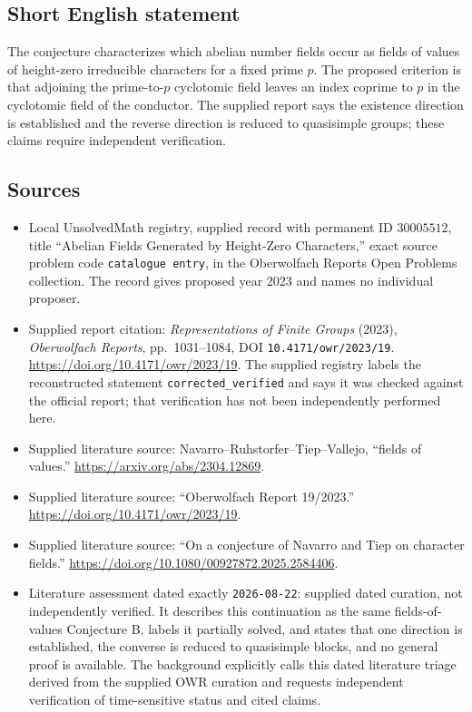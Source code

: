 \documentclass[11pt]{article}
\begin{document}
\subsection{Short English statement}
The conjecture characterizes which abelian number fields occur as fields of values of height-zero irreducible characters for a fixed prime \(p\). The proposed criterion is that adjoining the prime-to-\(p\) cyclotomic field leaves an index coprime to \(p\) in the cyclotomic field of the conductor. The supplied report says the existence direction is established and the reverse direction is reduced to quasisimple groups; these claims require independent verification.
\subsection{Sources}
\begin{itemize}
\item Local UnsolvedMath registry, supplied record with permanent ID \(30005512\), title ``Abelian Fields Generated by Height-Zero Characters,'' exact source problem code \texttt{catalogue entry}, in the Oberwolfach Reports Open Problems collection. The record gives proposed year 2023 and names no individual proposer.
\item Supplied report citation: \emph{Representations of Finite Groups} (2023), \emph{Oberwolfach Reports}, pp.~1031--1084, DOI \texttt{10.4171/owr/2023/19}. \url{https://doi.org/10.4171/owr/2023/19}. The supplied registry labels the reconstructed statement \texttt{corrected\_verified} and says it was checked against the official report; that verification has not been independently performed here.
\item Supplied literature source: Navarro--Ruhstorfer--Tiep--Vallejo, ``fields of values.'' \url{https://arxiv.org/abs/2304.12869}.
\item Supplied literature source: ``Oberwolfach Report 19/2023.'' \url{https://doi.org/10.4171/owr/2023/19}.
\item Supplied literature source: ``On a conjecture of Navarro and Tiep on character fields.'' \url{https://doi.org/10.1080/00927872.2025.2584406}.
\item Literature assessment dated exactly \texttt{2026-08-22}: supplied dated curation, not independently verified. It describes this continuation as the same fields-of-values Conjecture B, labels it partially solved, and states that one direction is established, the converse is reduced to quasisimple blocks, and no general proof is available. The background explicitly calls this dated literature triage derived from the supplied OWR curation and requests independent verification of time-sensitive status and cited claims.
\end{itemize}
\end{document}
